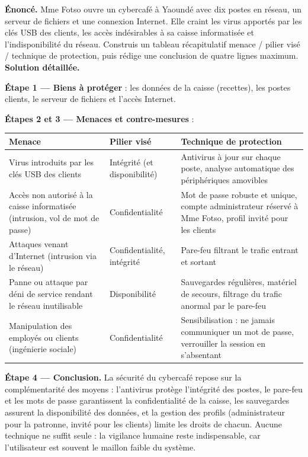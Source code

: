 \documentclass[11pt]{article}
\begin{document}
\begin{exoresolu}
\textbf{Énoncé.} Mme Fotso ouvre un cybercafé à Yaoundé avec dix postes en réseau, un serveur de fichiers et une connexion Internet. Elle craint les virus apportés par les clés USB des clients, les accès indésirables à sa caisse informatisée et l'indisponibilité du réseau. Construis un tableau récapitulatif menace / pilier visé / technique de protection, puis rédige une conclusion de quatre lignes maximum.
\tcblower
\textbf{Solution détaillée.}

\textbf{Étape 1 — Biens à protéger} : les données de la caisse (recettes), les postes clients, le serveur de fichiers et l'accès Internet.

\textbf{Étapes 2 et 3 — Menaces et contre-mesures} :

\begin{center}
\begin{tabularx}{\linewidth}{|X|l|X|}
\hline
\rowcolor{popblueL} \textbf{Menace} & \textbf{Pilier visé} & \textbf{Technique de protection} \\
\hline
Virus introduits par les clés USB des clients & Intégrité (et disponibilité) & Antivirus à jour sur chaque poste, analyse automatique des périphériques amovibles \\
\hline
Accès non autorisé à la caisse informatisée (intrusion, vol de mot de passe) & Confidentialité & Mot de passe robuste et unique, compte administrateur réservé à Mme Fotso, profil invité pour les clients \\
\hline
Attaques venant d'Internet (intrusion via le réseau) & Confidentialité, intégrité & Pare-feu filtrant le trafic entrant et sortant \\
\hline
Panne ou attaque par déni de service rendant le réseau inutilisable & Disponibilité & Sauvegardes régulières, matériel de secours, filtrage du trafic anormal par le pare-feu \\
\hline
Manipulation des employés ou clients (ingénierie sociale) & Confidentialité & Sensibilisation : ne jamais communiquer un mot de passe, verrouiller la session en s'absentant \\
\hline
\end{tabularx}
\end{center}

\textbf{Étape 4 — Conclusion.} La sécurité du cybercafé repose sur la complémentarité des moyens : l'antivirus protège l'intégrité des postes, le pare-feu et les mots de passe garantissent la confidentialité de la caisse, les sauvegardes assurent la disponibilité des données, et la gestion des profils (administrateur pour la patronne, invité pour les clients) limite les droits de chacun. Aucune technique ne suffit seule : la vigilance humaine reste indispensable, car l'utilisateur est souvent le maillon faible du système.
\end{exoresolu}
\end{document}
